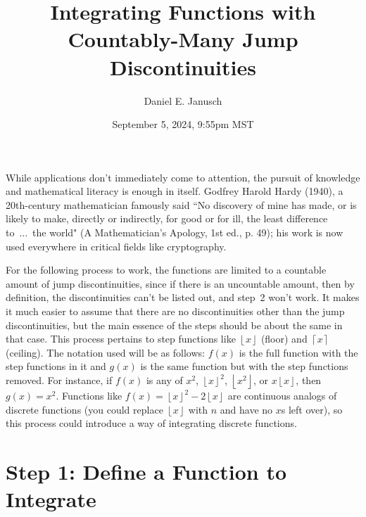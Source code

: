 \documentclass[12pt]{article}
\providecommand \floor [1]{\left\lfloor #1 \right\rfloor}
\providecommand \ceil [1]{ \left\lceil  #1 \right\rceil}
\begin{document}
{}

\title{Integrating Functions with Countably-Many Jump Discontinuities}
\author{Daniel E. Janusch}
\date{September 5, 2024, 9:55pm MST}
\maketitle

	\indent While applications don't immediately come to attention, the pursuit of knowledge and
	mathematical literacy is enough in itself. Godfrey Harold Hardy (1940), a 20th-century
	mathematician famously said ``No discovery of mine has made, or is likely to make, directly
	or indirectly, for good or for ill, the least difference to~...~the world" (A Mathematician's
	Apology, 1st ed., p. 49); his work is now used everywhere in critical fields like
	cryptography.

	\indent For the following process to work, the functions are limited to a countable amount of
	jump discontinuities, since if there is an uncountable amount, then by definition, the
	discontinuities can't be listed out, and step~2 won't work. It makes it much easier to assume
	that there are no discontinuities other than the jump discontinuities, but the main essence of
	the steps should be about the same in that case. This process pertains to step functions like
	$\floor x$ (floor) and $\ceil x$ (ceiling). The notation used will be as follows: $f(x)$ is
	the full function with the step functions in it and  $g(x)$ is the same function but with the
	step functions removed. For instance, if $f(x)$ is any of $x^2$, $\floor{x}^2$, $\floor{x^2}$,
	or $x\floor x$, then $g(x) = x^2$. Functions like $f(x) = \floor{x}^2 - 2\floor x$ are
	continuous analogs of discrete functions (you could replace $\floor x$ with $n$ and have no
	$x$s left over), so this process could introduce a way of integrating discrete functions.

{}
\section*{Step 1: Define a Function to Integrate}
\end{document}
